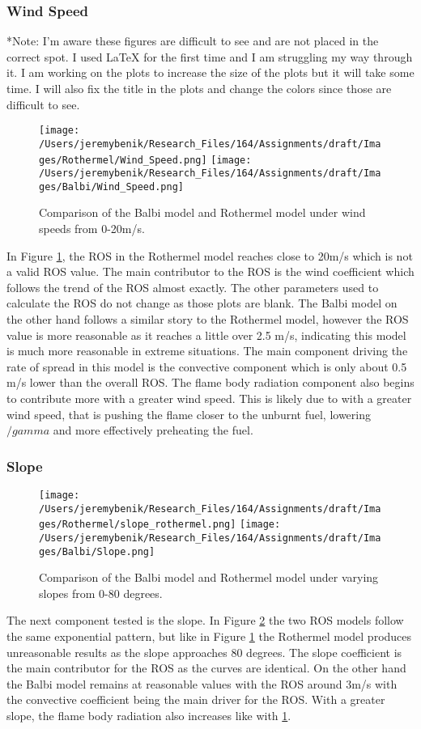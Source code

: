 \documentclass{article}
\begin{document}
\subsubsection{Wind Speed}
*Note: I'm aware these figures are difficult to see and are not placed in the correct spot. I used LaTeX for the first time and I am struggling my way through it. I am working on the plots to increase the size of the plots but it will take some time. I will also fix the title in the plots and change the colors since those are difficult to see. \\
\begin{figure}[h]
\centering
  \texttt{[image: /Users/jeremybenik/Research\_Files/164/Assignments/draft/Images/Rothermel/Wind\_Speed.png]}
  \texttt{[image: /Users/jeremybenik/Research\_Files/164/Assignments/draft/Images/Balbi/Wind\_Speed.png]}
  \caption{Comparison of the Balbi model and Rothermel model under wind speeds from 0-20m/s.}
  \label{Wind Speed}
\end{figure}
\indent In Figure \ref{Wind Speed}, the ROS in the Rothermel model reaches close to 20m/s which is not a valid ROS value. The main contributor to the ROS is the wind coefficient which follows the trend of the ROS almost exactly. The other parameters used to calculate the ROS do not change as those plots are blank. The Balbi model on the other hand follows a similar story to the Rothermel model, however the ROS value is more reasonable as it reaches a little over 2.5 m/s, indicating this model is much more reasonable in extreme situations. The main component driving the rate of spread in this model is the convective component which is only about 0.5 m/s lower than the overall ROS. The flame body radiation component also begins to contribute more with a greater wind speed. This is likely due to with a greater wind speed, that is pushing the flame closer to the unburnt fuel, lowering $/gamma$ and more effectively preheating the fuel. 
\subsubsection{Slope}
\begin{figure}[h]
\centering
  \texttt{[image: /Users/jeremybenik/Research\_Files/164/Assignments/draft/Images/Rothermel/slope\_rothermel.png]}
  \texttt{[image: /Users/jeremybenik/Research\_Files/164/Assignments/draft/Images/Balbi/Slope.png]}
  \caption{Comparison of the Balbi model and Rothermel model under varying slopes from 0-80 degrees.}
  \label{Slope}
\end{figure}
\indent The next component tested is the slope. In Figure \ref{Slope} the two ROS models follow the same exponential pattern, but like in Figure \ref{Wind Speed} the Rothermel model produces unreasonable results as the slope approaches 80 degrees. The slope coefficient is the main contributor for the ROS as the curves are identical. On the other hand the Balbi model remains at reasonable values with the ROS around 3m/s with the convective coefficient being the main driver for the ROS. With a greater slope, the flame body radiation also increases like with \ref{Wind Speed}. 
\end{document}
